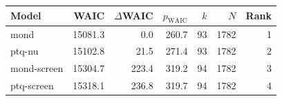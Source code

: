 \begin{tabular}{lrrrrrr}
\toprule
Model & WAIC & $\Delta$WAIC & $p_{\mathrm{WAIC}}$ & $k$ & $N$ & Rank \\
\midrule
mond & 15081.3 & 0.0 & 260.7 & 93 & 1782 & 1 \\
ptq-nu & 15102.8 & 21.5 & 271.4 & 93 & 1782 & 2 \\
mond-screen & 15304.7 & 223.4 & 319.2 & 94 & 1782 & 3 \\
ptq-screen & 15318.1 & 236.8 & 319.7 & 94 & 1782 & 4 \\
\bottomrule
\end{tabular}
